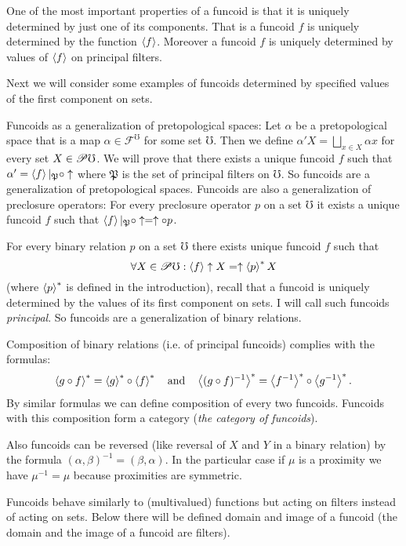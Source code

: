 One of the most important properties of a funcoid is that it is uniquely
determined by just one of its components. That is a funcoid $f$ is
uniquely determined by the function $\left\langle f\right\rangle$. Moreover a funcoid
$f$ is uniquely determined by values of $\left\langle f\right\rangle$ on principal
filters.

Next we will consider some examples of funcoids determined by specified
values of the first component on sets.

Funcoids as a generalization of pretopological spaces: Let $\alpha$
be a pretopological space that is a map \emph{$\alpha\in\mathscr{F}^{\mho}$}
for some set $\mho$. Then we define $\alpha'X=\bigsqcup_{x\in X}\alpha x$
for every set $X\in\mathscr{P}\mho$. We will prove that there exists
a unique funcoid $f$ such that $\alpha'=\left\langle f\right\rangle|_{\mathfrak{P}}\circ\uparrow$
where $\mathfrak{P}$ is the set of principal filters on $\mho$.
So funcoids are a generalization of pretopological spaces. Funcoids
are also a generalization of preclosure operators: For every preclosure
operator $p$ on a set $\mho$ it exists a unique funcoid $f$ such
that $\left\langle f\right\rangle|_{\mathfrak{P}}\circ\uparrow=\uparrow\circ p$.

For every binary relation $p$ on a set $\mho$ there exists unique
funcoid $f$ such that
\[
\forall X\in\mathscr{P}\mho:\left\langle f\right\rangle\uparrow X=\uparrow\left\langle p\right\rangle ^{\ast}X
\]
(where $\left\langle p\right\rangle ^{\ast}$ is defined in the introduction), recall that
a funcoid is uniquely determined by the values of its first component
on sets. I will call such funcoids \emph{principal}. So funcoids are
a generalization of binary relations.

Composition of binary relations (i.e. of principal funcoids) complies
with the formulas:
\[
\left\langle g\circ f\right\rangle ^{\ast}=\left\langle g\right\rangle ^{\ast}\circ\left\langle f\right\rangle ^{\ast}\quad\text{and}\quad\left\langle (g\circ
f)^{-1}\right\rangle ^{\ast}=\left\langle f^{-1}\right\rangle ^{\ast}\circ\left\langle g^{-1}\right\rangle ^{\ast}.
\]
By similar formulas we can define composition of every two funcoids.
Funcoids with this composition form a category (\emph{the category
of funcoids}).

Also funcoids can be reversed (like reversal of $X$ and $Y$ in a
binary relation) by the formula $(\alpha,\beta)^{-1}=(\beta,\alpha)$.
In the particular case if $\mu$ is a proximity we have $\mu^{-1}=\mu$
because proximities are symmetric.

Funcoids behave similarly to (multivalued) functions but acting on
filters instead of acting on sets. Below there will be defined domain
and image of a funcoid (the domain and the image of a funcoid are
filters).


